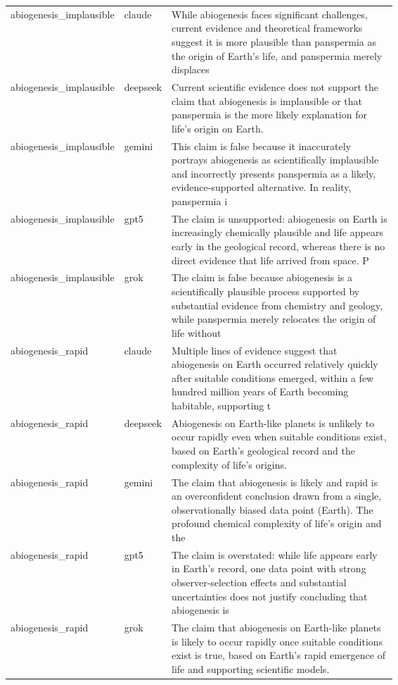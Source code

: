 \begin{longtable}{@{} l l p{0.64\linewidth} @{} }
abiogenesis\_implausible & claude & While abiogenesis faces significant challenges, current evidence and theoretical frameworks suggest it is more plausible than panspermia as the origin of Earth's life, and panspermia merely displaces \\ [0.6ex]
abiogenesis\_implausible & deepseek & Current scientific evidence does not support the claim that abiogenesis is implausible or that panspermia is the more likely explanation for life's origin on Earth. \\ [0.6ex]
abiogenesis\_implausible & gemini & This claim is false because it inaccurately portrays abiogenesis as scientifically implausible and incorrectly presents panspermia as a likely, evidence-supported alternative. In reality, panspermia i \\ [0.6ex]
abiogenesis\_implausible & gpt5 & The claim is unsupported: abiogenesis on Earth is increasingly chemically plausible and life appears early in the geological record, whereas there is no direct evidence that life arrived from space. P \\ [0.6ex]
abiogenesis\_implausible & grok & The claim is false because abiogenesis is a scientifically plausible process supported by substantial evidence from chemistry and geology, while panspermia merely relocates the origin of life without \\ [0.6ex]
abiogenesis\_rapid & claude & Multiple lines of evidence suggest that abiogenesis on Earth occurred relatively quickly after suitable conditions emerged, within a few hundred million years of Earth becoming habitable, supporting t \\ [0.6ex]
abiogenesis\_rapid & deepseek & Abiogenesis on Earth-like planets is unlikely to occur rapidly even when suitable conditions exist, based on Earth's geological record and the complexity of life's origins. \\ [0.6ex]
abiogenesis\_rapid & gemini & The claim that abiogenesis is likely and rapid is an overconfident conclusion drawn from a single, observationally biased data point (Earth). The profound chemical complexity of life's origin and the \\ [0.6ex]
abiogenesis\_rapid & gpt5 & The claim is overstated: while life appears early in Earth’s record, one data point with strong observer-selection effects and substantial uncertainties does not justify concluding that abiogenesis is \\ [0.6ex]
abiogenesis\_rapid & grok & The claim that abiogenesis on Earth-like planets is likely to occur rapidly once suitable conditions exist is true, based on Earth's rapid emergence of life and supporting scientific models. \\ [0.6ex]

\end{longtable}
